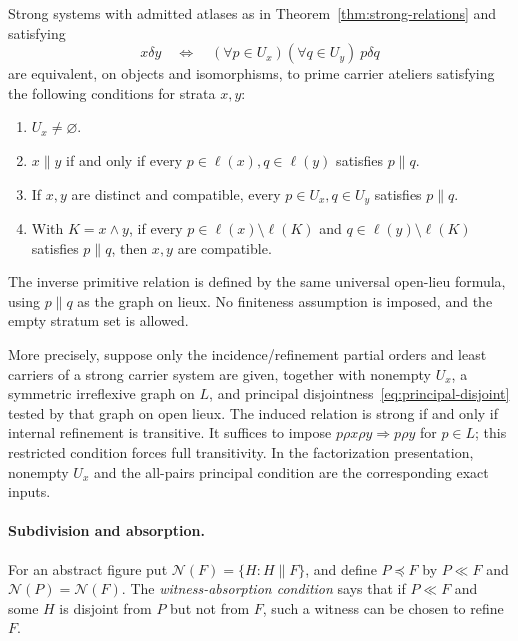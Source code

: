 \begin{theorem}
\label{thm:local-relations}
Strong systems with admitted atlases as in
Theorem~\ref{thm:strong-relations} and satisfying
\[
 x\delta y\quad\Longleftrightarrow\quad
 (\forall p\in U_x)(\forall q\in U_y)\ p\delta q
\]
are equivalent, on objects and isomorphisms, to prime carrier
ateliers satisfying the following conditions for strata $x,y$:
\begin{enumerate}
\item $U_x\ne\varnothing$.
\item $x\parallel y$ if and only if every
$p\in\ell(x),q\in\ell(y)$ satisfies $p\parallel q$.
\item If $x,y$ are distinct and compatible, every
$p\in U_x,q\in U_y$ satisfies $p\parallel q$.
\item With $K=x\wedge y$, if every
$p\in\ell(x)\setminus\ell(K)$ and
$q\in\ell(y)\setminus\ell(K)$ satisfies $p\parallel q$,
then $x,y$ are compatible.
\end{enumerate}
The inverse primitive relation is defined by the same universal
open-lieu formula, using $p\parallel q$ as the graph on lieux.
No finiteness assumption is imposed, and the empty stratum set
is allowed.

More precisely, suppose only the incidence/refinement partial
orders and least carriers of a strong carrier system are given,
together with nonempty $U_x$, a symmetric irreflexive graph on
$L$, and principal disjointness~\eqref{eq:principal-disjoint}
tested by that graph on open lieux. The induced relation is
strong if and only if internal refinement is transitive.
It suffices to impose
$p\rho x\rho y\Longrightarrow p\rho y$ for $p\in L$;
this restricted condition forces full transitivity.
In the factorization presentation, nonempty $U_x$ and the
all-pairs principal condition are the corresponding exact inputs.
\end{theorem}

\paragraph{Subdivision and absorption.}
For an abstract figure put
$\mathcal N(F)=\{H:H\parallel F\}$, and define
$P\preceq F$ by $P\ll F$ and
$\mathcal N(P)=\mathcal N(F)$.
The \emph{witness-absorption condition} says that if $P\ll F$
and some $H$ is disjoint from $P$ but not from $F$, such a witness
can be chosen to refine $F$.


